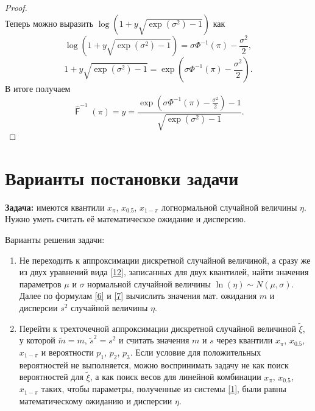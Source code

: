 \documentclass[specialist, substylefile = spbu.rtx,
subf,href,colorlinks=true, 12pt]{disser}
\DeclareMathOperator{\F}{\mathsf{F}}
\begin{document}
\begin{proof}
\begin{equation*}
		\end{equation*}
		Теперь можно выразить $\log(1+y\sqrt{\exp(\sigma ^{2})-1})$ как
		\begin{equation*}
			\displaystyle{\log(1+y\sqrt{\exp(\sigma ^{2})-1}) = \sigma\Phi^{-1}(\pi) - \frac{\sigma^{2} }{2}},
		\end{equation*}
		\begin{equation*}
			1+y\sqrt{\exp(\sigma ^{2})-1} = \exp\left( \sigma\Phi^{-1}(\pi) - \frac{\sigma^{2} }{2}\right) .
		\end{equation*}
		В итоге получаем
		\begin{equation*}
			\displaystyle{\hat{\F}^{-1}(\pi) = y = \frac{\exp(\sigma\Phi^{-1}(\pi) - \frac{\sigma^{2} }{2})-1}{\sqrt{\exp(\sigma ^{2})-1}}}.
		\end{equation*}
	\end{proof}
	
	\section{Варианты постановки задачи}
	
	\textbf{Задача:} имеются квантили $x_{\pi}$, $x_{0.5}$, $x_{1-\pi}$ логнормальной случайной величины $\eta$. Нужно уметь считать её математическое ожидание и дисперсию.
	
	Варианты решения задачи:
	\begin{enumerate}
		\item Не переходить к аппроксимации дискретной случайной величиной, а сразу же из двух уравнений вида \eqref{12}, записанных для двух квантилей, найти значения параметров $\mu$ и $\sigma$ нормальной случайной величины $\ln(\eta)\sim N(\mu, \sigma)$. Далее по формулам \eqref{6} и \eqref{7} вычислить значения мат. ожидания $m$ и дисперсии $s^{2}$ случайной величины $\eta$.
		\item Перейти к трехточечной аппроксимации дискретной случайной величиной $\tilde{\xi}$, у которой $\tilde{m} = m$, $\tilde{s}^{2}=s^{2}$ и считать значения $m$ и $s$ через квантили $x_{\pi}$, $x_{0.5}$, $x_{1-\pi}$ и вероятности $p_{1}$, $p_{2}$, $p_{3}$.
		Если условие для положительных вероятностей не выполняется, можно воспринимать задачу не как поиск вероятностей для $\tilde{\xi}$, а как поиск весов для линейной комбинации $x_{\pi}$, $x_{0.5}$, $x_{1-\pi}$ таких, чтобы параметры, полученные из системы \eqref{1}, были равны математическому ожиданию и дисперсии $\eta$. 
	\end{enumerate}
	
\end{document}
